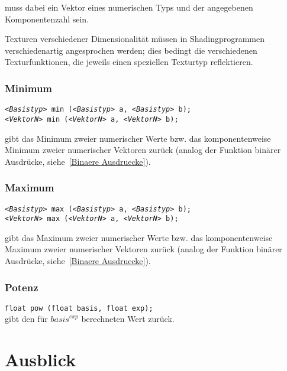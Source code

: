 \documentclass[twoside,a4paper,fleqn,12pt]{article}
\begin{document}
 muss dabei ein Vektor eines numerischen Typs und der angegebenen
Komponentenzahl sein.

Texturen verschiedener
Dimensionalität müssen in Shadingprogrammen verschiedenartig angesprochen werden;
dies bedingt die verschiedenen Texturfunktionen, die jeweils einen speziellen Texturtyp
reflektieren.

\subsubsection{Minimum}

\texttt{\emph{<Basistyp>} min (\emph{<Basistyp>} a, \emph{<Basistyp>} b);}\\
\texttt{\emph{<VektorN>} min (\emph{<VektorN>} a, \emph{<VektorN>} b);}

 gibt das Minimum zweier numerischer Werte bzw. das komponentenweise
Minimum zweier numerischer Vektoren zurück (analog der Funktion binärer Ausdrücke,
siehe~\ref{Binaere Ausdruecke}).

\subsubsection{Maximum}

\texttt{\emph{<Basistyp>} max (\emph{<Basistyp>} a, \emph{<Basistyp>} b);}\\
\texttt{\emph{<VektorN>} max (\emph{<VektorN>} a, \emph{<VektorN>} b);}

 gibt das Maximum zweier numerischer Werte bzw. das komponentenweise
Maximum zweier numerischer Vektoren zurück (analog der Funktion binärer Ausdrücke,
siehe~\ref{Binaere Ausdruecke}).

\subsubsection{Potenz}

\texttt{float pow (float basis, float exp);}\\

 gibt den für $\mathit{basis}^\mathit{exp}$ berechneten Wert zurück.


\section{Ausblick}

\cleardoublepage
\appendix

\end{document}
